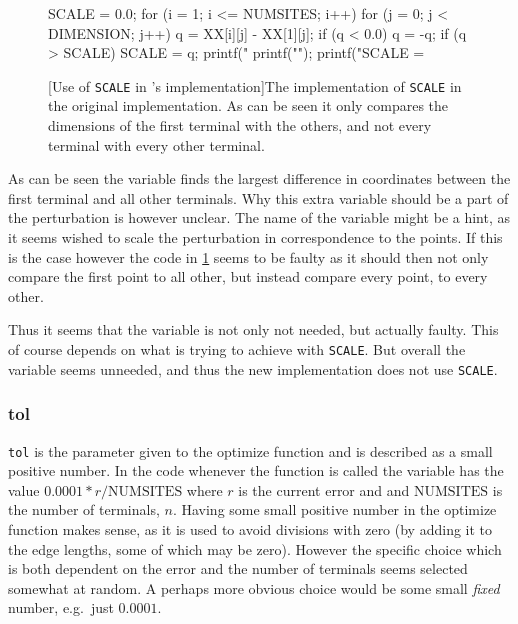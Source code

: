\begin{figure}[htbp]
\begin{c-code}
SCALE = 0.0;
for (i = 1; i <= NUMSITES; i++) {
  for (j = 0; j < DIMENSION; j++) {
    q = XX[i][j] - XX[1][j];
    if (q < 0.0) q = -q;
    if (q > SCALE) SCALE = q;
    printf(" %
  }
  printf("\n");
}
printf("SCALE = %
\end{c-code}
  [Use of \texttt{SCALE} in \citeauthor{smith1992}'s implementation]{The implementation
    of \texttt{SCALE} in the original implementation. As can be seen it only
    compares the dimensions of the first terminal with the others, and not every
    terminal with every other terminal.\label{fig:randm}}
\end{figure}

As can be seen the variable finds the largest difference in coordinates between the first
terminal and all other terminals. Why this extra variable should be a part of
the perturbation is however unclear. The name of the variable might be a hint,
as it seems \citeauthor{smith1992} wished to scale the perturbation in correspondence to the
points. If this is the case however the code in \cref{fig:randm} seems to be
faulty as it should then not only compare the first point to all other, but
instead compare every point, to every other.

Thus it seems that the variable is not only not needed, but actually faulty.
This of course depends on what \citeauthor{smith1992} is trying to achieve with \texttt{SCALE}.
But overall the variable seems unneeded, and thus the new implementation does
not use \texttt{SCALE}.

\subsubsection{tol}
\label{sec:tol}

\texttt{tol} is the parameter given to the optimize function and is described as
a small positive number. In the code whenever the function is called the
variable has the value $0.0001*r/\text{NUMSITES}$ where $r$ is the current
error and and $\text{NUMSITES}$ is the number of terminals, $n$. Having some
small positive number in the optimize function makes sense, as it is used to
avoid divisions with zero (by adding it to the edge lengths, some of which may
be zero). However the specific choice which is both dependent on the error and
the number of terminals seems selected somewhat at random. A perhaps more
obvious choice would be some small \textit{fixed} number, e.g.\ just $0.0001$.

